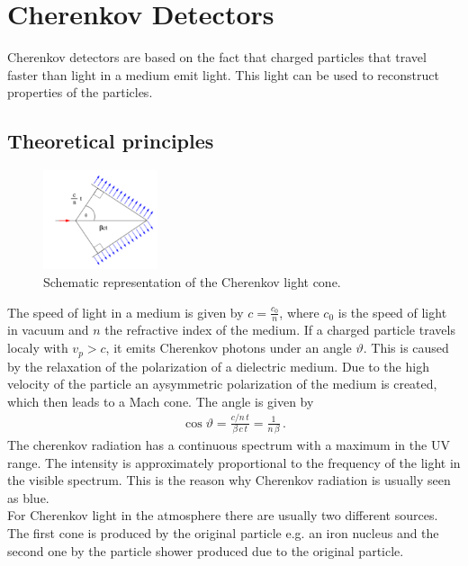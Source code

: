 \section{Cherenkov Detectors \cite{cherenkov}}
Cherenkov detectors are based on the fact that charged particles that travel faster than light in a medium emit light. This light can be used to reconstruct properties of the particles.
\subsection{Theoretical principles}
\begin{figure}
    \includegraphics[width=0.3\textwidth]{graphics/Cone.png}
    \caption{Schematic representation of the Cherenkov light cone. \cite{cherenkov}}
  \end{figure}
  \FloatBarrier
The speed of light in a medium is given by $c = \frac{c_0}{n}$, where $c_0$ is the speed of light in vacuum and $n$ the refractive index of the medium. If a charged particle travels localy with $v_p > c$, it emits Cherenkov photons under an angle $\vartheta$. This is caused by the relaxation of the polarization of a dielectric medium. Due to the high velocity of the particle an aysymmetric polarization of the medium is created, which then leads to a Mach cone. The angle is given by
\begin{align*}
  \cos \vartheta = \frac{c/n \, t}{\beta\, c\, t} = \frac{1}{n \, \beta} \, .
\end{align*}
The cherenkov radiation has a continuous spectrum with a maximum in the UV range. The intensity is approximately proportional to the frequency of the light in the visible spectrum. This is the reason why Cherenkov radiation is usually seen as blue.\\
For Cherenkov light in the atmosphere there are usually two different sources. The first cone is produced by the original particle e.g. an iron nucleus and the second one by the particle shower produced due to the original particle.
